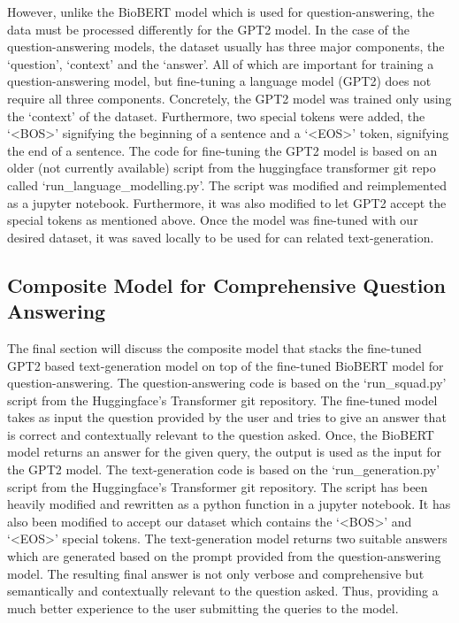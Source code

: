 		However, unlike the BioBERT model which is used for question-answering, the data must be processed differently for the GPT2 model. In the case of the question-answering models, the dataset usually has three major components, the `question', `context' and the `answer'. All of which are important for training a question-answering model, but fine-tuning a language model (GPT2) does not require all three components. Concretely, the GPT2 model was trained only using the `context' of the dataset. Furthermore,  two special tokens were added, the `<BOS>' signifying the beginning of a sentence and a `<EOS>' token, signifying the end of a sentence. The code for fine-tuning the GPT2 model is based on an older (not currently available) script from the huggingface transformer git repo called `run\_language\_modelling.py'. The script was modified and reimplemented as a jupyter notebook. Furthermore, it was also modified to let GPT2 accept the special tokens as mentioned above. Once the model was fine-tuned with our desired dataset, it was saved locally to be used for can related text-generation.
		
	\subsection*{Composite Model for Comprehensive Question Answering}
		The final section will discuss the composite model that stacks the fine-tuned GPT2 based text-generation model on top of  the fine-tuned BioBERT model for question-answering. The question-answering code is based on the `run\_squad.py' script from the Huggingface’s Transformer git repository. The fine-tuned model takes as input the question provided by the user and tries to give an answer that is correct and contextually relevant to the question asked. Once, the BioBERT model returns an answer for the given query, the output is used as the input for the GPT2 model. The text-generation code is based on the `run\_generation.py' script from the Huggingface’s Transformer git repository. The script has been heavily modified and rewritten as a python function in a jupyter notebook. It has also been modified to accept our dataset which contains the `<BOS>' and `<EOS>' special tokens. The text-generation model returns two suitable answers which are generated based on the prompt provided from the question-answering model. The resulting final answer is not only verbose and comprehensive but semantically and contextually relevant to the question asked. Thus, providing a much better experience to the user submitting the queries to the model.